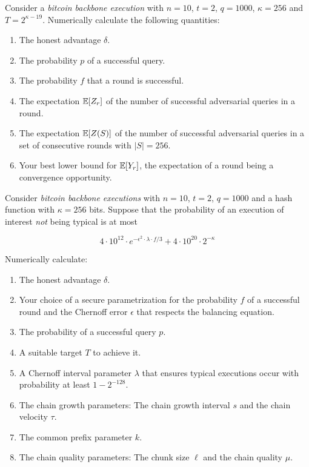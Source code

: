 \begin{problems}
    \item Consider a \emph{bitcoin backbone execution} with $n = 10$, $t = 2$,
          $q = 1000$, $\kappa = 256$ and $T = 2^{\kappa - 19}$. Numerically
          calculate the following quantities:

          \begin{enumerate}
            \item The honest advantage $\delta$.
            \item The probability $p$ of a successful query.
            \item The probability $f$ that a round is successful.
            \item The expectation $\operatorname{\mathbb{E}}[Z_r]$ of the number of successful
                  adversarial queries in a round.
            \item The expectation $\operatorname{\mathbb{E}}[Z(S)]$ of the number of successful
                  adversarial queries in a set of consecutive rounds with
                  $|S| = 256$.
            \item Your best lower bound for $\operatorname{\mathbb{E}}[Y_r]$, the expectation of a
                  round being a convergence opportunity.
          \end{enumerate}

    \item Consider \emph{bitcoin backbone executions} with $n = 10$, $t = 2$,
          $q = 1000$ and a hash function with $\kappa = 256$ bits. Suppose that
          the probability of an execution of interest \emph{not} being typical is at most

          \[
            4 \cdot 10^{12} \cdot e^{- \epsilon ^ 2 \cdot \lambda \cdot f / 3}
            + 4 \cdot 10^{20} \cdot 2^{-\kappa}
          \]

          Numerically calculate:

          \begin{enumerate}
            \item The honest advantage $\delta$.
            \item Your choice of a secure parametrization for the probability
                  $f$ of a successful round and the Chernoff error $\epsilon$
                  that respects the balancing equation.
            \item The probability of a successful query $p$.
            \item A suitable target $T$ to achieve it.
            \item A Chernoff interval parameter $\lambda$ that ensures typical
                  executions occur with probability at least $1 - 2^{-128}$.
            \item The chain growth parameters: The chain growth interval $s$ and
                  the chain velocity $\tau$.
            \item The common prefix parameter $k$.
            \item The chain quality parameters: The chunk size $\ell$ and the
                  chain quality $\mu$.
          \end{enumerate}
    

\end{problems}
